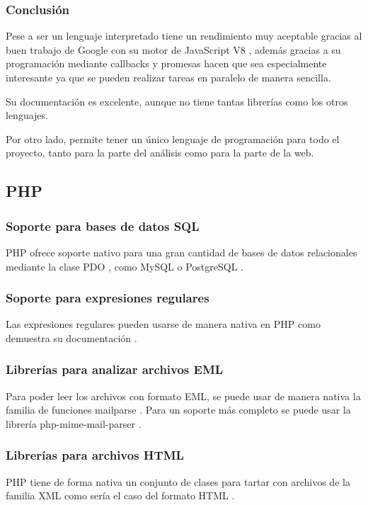 \subsubsection{Conclusión}
Pese a ser un lenguaje interpretado tiene un rendimiento muy aceptable gracias al buen trabajo de Google con su motor de JavaScript V8 \cite{node_engine}, además gracias a su programación mediante callbacks y promesas hacen que sea especialmente interesante ya que se pueden realizar tareas en paralelo de manera sencilla.

Su documentación es excelente, aunque no tiene tantas librerías como los otros lenguajes.

Por otro lado, permite tener un único lenguaje de programación para todo el proyecto, tanto para la parte del análisis como para la parte de la web. 


\subsection{PHP}

\subsubsection{Soporte para bases de datos SQL}
PHP ofrece soporte nativo para una gran cantidad de bases de datos relacionales mediante la clase PDO \cite{php_pdo}, como MySQL o PostgreSQL \cite{php_pdo_drivers}.

\subsubsection{Soporte para expresiones regulares}
Las expresiones regulares pueden usarse de manera nativa en PHP como demuestra su documentación \cite{php_pcre}.

\subsubsection{Librerías para analizar archivos EML}
Para poder leer los archivos con formato EML, se puede usar de manera nativa la familia de funciones mailparse \cite{php_Mailparse}. Para un soporte más completo se puede usar la librería php-mime-mail-parser \cite{php_php_mime_mail_parser}.

\subsubsection{Librerías para archivos HTML}
PHP tiene de forma nativa un conjunto de clases para tartar con archivos de la familia XML como sería el caso del formato HTML \cite{php_dom}.

